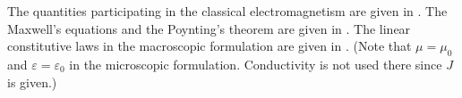 \begin{discussion}
  The quantities participating in the classical electromagnetism are given in
  .
  The Maxwell's equations and the Poynting's theorem are given in
  .
  The linear constitutive laws in the macroscopic formulation are given in
  .
  (Note that $\mu = \mu_0$ and $\varepsilon = \varepsilon_0$ in the microscopic
  formulation.
  Conductivity is not used there since $J$ is given.)
\end{discussion}
